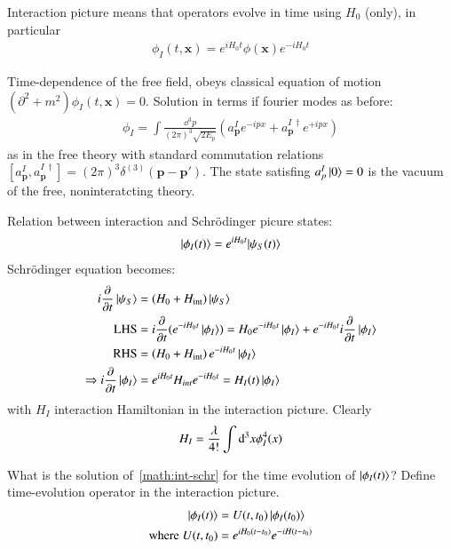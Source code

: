 Interaction picture means that operators evolve in time using $H_0$ (only), in particular 
\begin{align}
	\phi_I(t,\pmb{x}) = e^{iH_0t}\phi(\pmb{x})e^{-iH_0t}
\end{align}

Time-dependence of the free field, obeys classical equation of motion $\left(\partial^2+m^2 \right)\phi_I(t,\pmb{x}) = 0$. Solution in terms if fourier modes as before:
\begin{align}
	\phi_I = \int \frac{\dd^3 p}{(2\pi)^3\sqrt{2E_p}} (a^I_{\pmb{p}}e^{-ipx} + a^{I\,\dagger}_{\pmb{p}}e^{+ipx})
\end{align}
as in the free theory with standard commutation relations $[a^I_{\pmb{p}}, a^{I\,\dagger}_{\pmb{p}}] = (2\pi)^3\delta^{(3)}(\pmb{p}-\pmb{p}')$. The state satisfing $a^I_p \ket{0} = 0$ is the vacuum of the free, noninteratcting theory.

Relation between interaction and Schrödinger picure states:
\begin{align}
	\ket{\phi_I(t)} = e^{iH_0t}{\ket{\psi_S(t)}}
\end{align}
Schrödinger equation becomes: 
\begin{align}
	i\frac{\partial}{\partial t}\ket{\psi_S} &= (H_0 + H_\text{int})\ket{\psi_S} \notag\\
	\text{LHS} &= i \frac{\partial}{\partial t} ( e^{-iH_0t}\ket{\phi_I}) = H_0 e^{-iH_0t}\ket{\phi_I} + e^{-iH_0t}i\frac{\partial}{\partial t}\ket{\phi_I} \notag\\
	\text{RHS}														&= \left(H_0 + H_\text{int}\right)e^{-iH_0t}\ket{\phi_I} \notag\\
	\Rightarrow i\frac{\partial}{\partial t}\ket{\phi_I} &= e^{iH_0t}H_{int} e^{-iH_0t} = H_I(t)\ket{\phi_I} \label{math:int-schr}
\end{align}
with $H_I$ interaction Hamiltonian in the interaction picture. Clearly
\begin{align}
	H_I = \frac{\lambda}{4!}\int\dd^3x\phi_I^4(x) \notag
\end{align}

What is the solution of~\ref{math:int-schr} for the time evolution of $\ket{\phi_I(t)}$? Define time-evolution operator in the interaction picture.
\begin{align}
	\ket{\phi_I(t)} &= U(t,t_0)\ket{\phi_I(t_0)}\label{math:int-schr2}\\
	\text{where} \; U(t,t_0) &= e^{iH_0(t-t_0)}e^{-iH(t-t_0)} 
\end{align}

